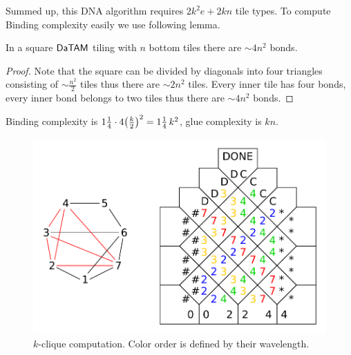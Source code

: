 Summed up, this DNA algorithm requires $2 k^2 e + 2 kn$ tile types. To compute Binding complexity easily we use following lemma.

\begin{lemma}
	In a square $\mathsf{DaTAM}$ tiling with $n$ bottom tiles there are $\sim 4 n^2$ bonds.
\end{lemma}
\begin{proof}
	Note that the square can be divided by diagonals into four triangles consisting of $\sim \frac{n^2}{2}$ tiles thus there are $\sim 2n^2$ tiles. Every inner tile has four bonds, every inner bond belongs to two tiles thus there are $\sim 4n^2$ bonds.
\end{proof}

Binding complexity is $1\nicefrac{1}{4} \cdot 4 \bigl(\frac{k}{2}\bigr)^2 = 1\nicefrac{1}{4}\,k^2$, glue complexity is $kn$.

\begin{figure}[H]
\begin{center}
	\includegraphics[scale=0.75]{./figures/k-clique/k-clique.pdf}
	\caption{$k$-clique computation. Color order is defined by their wavelength.}
	\label{fig:k-clique}
\end{center}
\end{figure}

